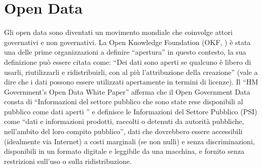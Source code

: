 \documentclass[12pt,a4paper]{report}
\begin{document}
\section{Open Data}\label{sec:opendata}




Gli open data sono diventati un movimento mondiale che coinvolge attori governativi e non governativi.
La Open Knowledge Foundation (OKF, \cite{okd}) è stata una delle prime organizzazioni a definire ``apertura'' in questo contesto, la sua definizione può essere citata come: ``Dei dati sono aperti se qualcuno è libero di usarli, riutilizzarli e ridistribuirli, con al più l'attribuzione della creazione'' (vale a dire che i dati possono essere utilizzati apertamente in termini di licenze). %
Il ``HM Government’s Open Data White Paper'' \cite{HMgov} afferma che il Open Government Data consta di ``Informazioni del settore pubblico che sono state rese disponibili al pubblico come dati aperti '' e definisce le Informazioni del Settore Pubblico (PSI) come ``dati e informazioni prodotti, raccolti o detenuti da autorità pubbliche, nell'ambito del loro compito pubblico'', dati che dovrebbero essere accessibili (idealmente via Internet) a costi marginali (se non nulli) e senza discriminazioni, disponibili in un formato digitale e leggibile da una macchina, e fornito senza restrizioni sull'uso o sulla ridistribuzione.


\end{document}
